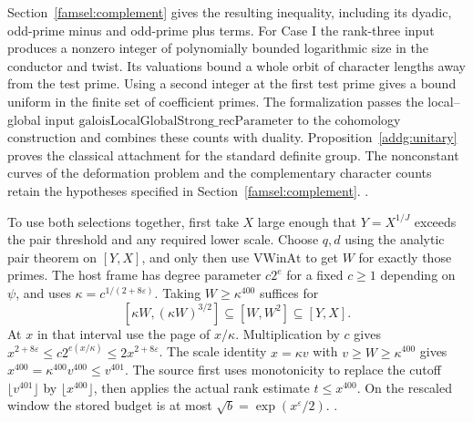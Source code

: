 Section~\ref{famsel:complement} gives the resulting inequality, including its dyadic, odd-prime minus and odd-prime plus terms. For Case I the rank-three input produces a nonzero integer of polynomially bounded logarithmic size in the conductor and twist. Its valuations bound a whole orbit of character lengths away from the test prime. Using a second integer at the first test prime gives a bound uniform in the finite set of coefficient primes. The formalization passes the local--global input \(\mathrm{galoisLocalGlobalStrong\_recParameter}\) to the cohomology construction and combines these counts with duality. Proposition~\ref{addg:unitary} proves the classical attachment for the standard definite group. The nonconstant curves of the deformation problem and the complementary character counts retain the hypotheses specified in Section~\ref{famsel:complement}. \quad
{}\quad
{}\quad
{}.

To use both selections together, first take \(X\) large enough that \(Y=X^{1/J}\) exceeds the pair threshold and any required lower scale. Choose \(q,d\) using the analytic pair theorem on \([Y,X]\), and only then use \(\mathrm{VWinAt}\) to get \(W\) for exactly those primes. The host frame has degree parameter \(c2^{e}\) for a fixed \(c\ge1\) depending on \(\psi\), and uses \(\kappa=c^{1/(2+8\varepsilon)}\). Taking \(W\ge\kappa^{400}\) suffices for
\[
 [\kappa W,(\kappa W)^{3/2}]\subseteq[W,W^2]\subseteq[Y,X].
\]
At \(x\) in that interval use the page of \(x/\kappa\). Multiplication by \(c\) gives \(x^{2+8\varepsilon}\le c2^{e(x/\kappa)}\le2x^{2+8\varepsilon}\). The scale identity \(x=\kappa v\) with \(v\ge W\ge\kappa^{400}\) gives \(x^{400}=\kappa^{400}v^{400}\le v^{401}\). The source first uses monotonicity to replace the cutoff \(\lfloor v^{401}\rfloor\) by \(\lfloor x^{400}\rfloor\), then applies the actual rank estimate \(t\le x^{400}\). On the rescaled window the stored budget is at most \(\sqrt b=\exp(x^\varepsilon/2)\). \quad
{}.

